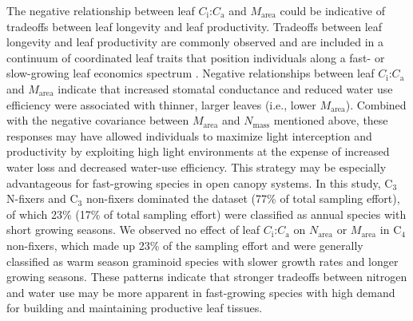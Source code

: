 The negative relationship between leaf $C_\mathrm{i}$:$C_\mathrm{a}$ and $M_\mathrm{area}$ could be indicative of tradeoffs between leaf longevity and leaf productivity. Tradeoffs between leaf longevity and leaf productivity are commonly observed and are included in a continuum of coordinated leaf traits that position individuals along a fast- or slow-growing leaf economics spectrum . Negative relationships between leaf $C_\mathrm{i}$:$C_\mathrm{a}$ and $M_\mathrm{area}$ indicate that increased stomatal conductance and reduced water use efficiency were associated with thinner, larger leaves (i.e., lower $M_\mathrm{area}$). Combined with the negative covariance between $M_\mathrm{area}$ and $N_\mathrm{mass}$ mentioned above, these responses may have allowed individuals to maximize light interception and productivity by exploiting high light environments at the expense of increased water loss and decreased water-use efficiency. This strategy may be especially advantageous for fast-growing species in open canopy systems. In this study, C$_3$ N-fixers and C$_3$ non-fixers dominated the dataset (77\% of total sampling effort), of which 23\% (17\% of total sampling effort) were classified as annual species with short growing seasons. We observed no effect of leaf $C_\mathrm{i}$:$C_\mathrm{a}$ on $N_\mathrm{area}$ or $M_\mathrm{area}$ in C$_4$ non-fixers, which made up 23\% of the sampling effort and were generally classified as warm season graminoid species with slower growth rates and longer growing seasons. These patterns indicate that stronger tradeoffs between nitrogen and water use may be more apparent in fast-growing species with high demand for building and maintaining productive leaf tissues.

